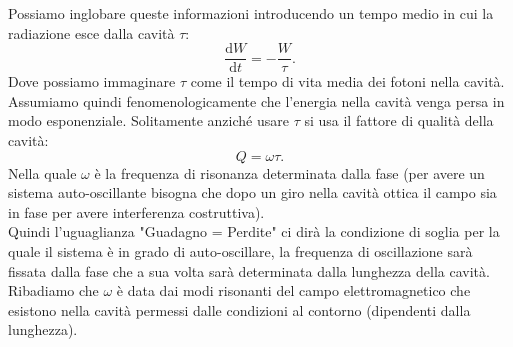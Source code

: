Possiamo inglobare queste informazioni introducendo un tempo medio in cui la radiazione esce dalla cavità $\tau$:
\[
\frac{\text{d} W}{\text{d} t} = - \frac{W}{\tau}
.\] 
Dove possiamo immaginare $\tau$ come il tempo di vita media dei fotoni nella cavità.\\
Assumiamo quindi fenomenologicamente che l'energia nella cavità venga persa in modo esponenziale. Solitamente anziché usare $\tau$  si usa il fattore di qualità della cavità:
\[
Q = \omega\tau
.\] 
Nella quale $\omega$ è la frequenza di risonanza determinata dalla fase (per avere un sistema auto-oscillante bisogna che dopo un giro nella cavità ottica il campo sia in fase per avere interferenza costruttiva).\\
Quindi l'uguaglianza "Guadagno = Perdite" ci dirà la condizione di soglia per la quale il sistema è in grado di auto-oscillare, la frequenza di oscillazione sarà fissata dalla fase che a sua volta sarà determinata dalla lunghezza della cavità.\\
Ribadiamo che $\omega$ è data dai modi risonanti del campo elettromagnetico che esistono nella cavità permessi dalle condizioni al contorno (dipendenti dalla lunghezza).
